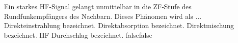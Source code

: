     {Ein starkes HF-Signal gelangt unmittelbar in die ZF-Stufe des Rundfunkempfängers des Nachbarn. Dieses Phänomen wird als ...}
    {Direkteinstrahlung bezeichnet.}
    {Direktabsorption bezeichnet.}
    {Direktmischung bezeichnet.}
    {HF-Durchschlag bezeichnet.}
    {false}{false}